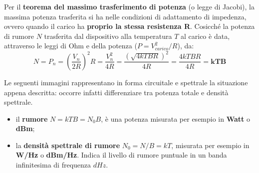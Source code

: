 \documentclass[openany,a4paper,12pt]{book}
\begin{document}
Per il \textbf{teorema del massimo trasferimento di potenza} (o legge di Jacobi), la massima potenza trasferita si ha nelle condizioni di adattamento di impedenza, ovvero quando il carico ha \textbf{proprio la stessa resistenza R}.
Cosicché la potenza di rumore $N$ trasferita dal dispositivo alla temperatura $T$ al carico è data, attraverso le leggi di Ohm e della potenza ($P = V_{carico}^2 / R$), da:
\begin{equation}
    N = P_n = \left( \frac{V_n}{2R} \right)^2 R = \frac{V_n^2}{4R} = \frac{(\sqrt{4kTBR})^2}{4R} = \frac{4kTBR}{4R} = \mathbf{kTB}
\end{equation}

Le seguenti immagini rappresentano in forma circuitale e spettrale la situazione appena descritta: occorre infatti differenziare tra potenza totale e densità spettrale.
\begin{itemize}[label=\textcolor{OpticRed}{\textbullet}]
    \item il \textbf{rumore} $N = kTB = N_0 B$, è una potenza misurata per esempio in \textbf{Watt} o \textbf{dBm};
    \item la \textbf{densità spettrale di rumore} $N_0 = N / B = kT$, misurata per esempio in \textbf{W/Hz} o \textbf{dBm/Hz}. Indica il livello di rumore puntuale in un banda infinitesima di frequenza $dHz$.
\end{itemize}
\end{document}
